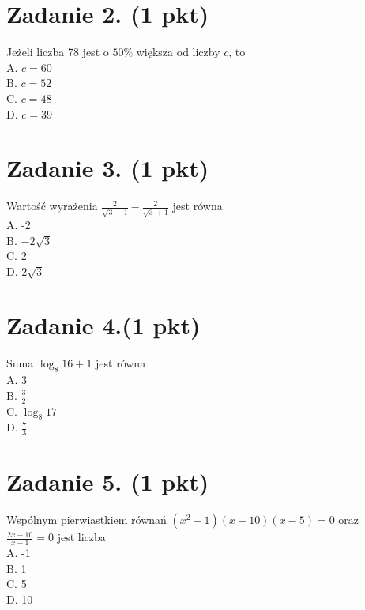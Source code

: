 \documentclass[10pt]{article}
\begin{document}
\section*{Zadanie 2. (1 pkt)}
Jeżeli liczba 78 jest o \(50 \%\) większa od liczby \(c\), to\\
A. \(c=60\)\\
B. \(c=52\)\\
C. \(c=48\)\\
D. \(c=39\)

\section*{Zadanie 3. (1 pkt)}
Wartość wyrażenia \(\frac{2}{\sqrt{3}-1}-\frac{2}{\sqrt{3}+1}\) jest równa\\
A. -2\\
B. \(-2 \sqrt{3}\)\\
C. 2\\
D. \(2 \sqrt{3}\)

\section*{Zadanie 4.(1 pkt)}
Suma \(\log _{8} 16+1\) jest równa\\
A. 3\\
B. \(\frac{3}{2}\)\\
C. \(\log _{8} 17\)\\
D. \(\frac{7}{3}\)

\section*{Zadanie 5. (1 pkt)}
Wspólnym pierwiastkiem równań \(\left(x^{2}-1\right)(x-10)(x-5)=0\) oraz \(\frac{2 x-10}{x-1}=0\) jest liczba\\
A. -1\\
B. 1\\
C. 5\\
D. 10
\end{document}
